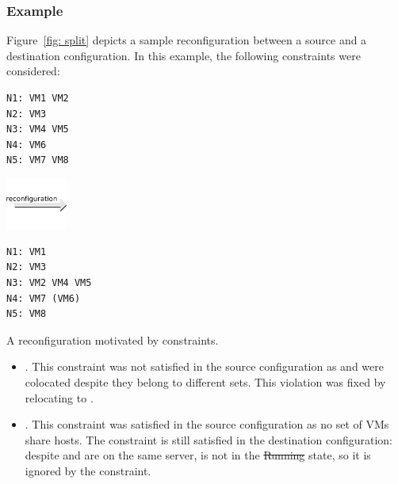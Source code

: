 \subsubsection{Example}

Figure~\ref{fig: split} depicts a sample reconfiguration between a source and a destination configuration. In this example, the following  constraints were considered:

\begin{reconfiguration}
\centering
\begin{minipage}[b]{0.40\textwidth}
\begin{lstlisting}
N1: VM1 VM2
N2: VM3
N3: VM4 VM5
N4: VM6
N5: VM7 VM8
\end{lstlisting}
\end{minipage}
\begin{minipage}[b]{2cm}
\includegraphics[width=2cm]{img/arrow_reconfiguration}
\end{minipage}
\begin{minipage}[b]{0.40\textwidth}
\begin{lstlisting}
N1: VM1
N2: VM3
N3: VM2 VM4 VM5
N4: VM7 (VM6)
N5: VM8
\end{lstlisting}
\end{minipage}
\caption{A reconfiguration motivated by  constraints.}\label{fig: split}
\end{reconfiguration}


\begin{itemize}

\item {}. This constraint was not satisfied in the source configuration as
 and  were colocated despite they belong to different sets. This violation was fixed
by relocating  to .

\item {}. This constraint was satisfied in the sour\-ce configuration as no set of VMs share hosts. The constraint is still satisfied in the destination configuration: despite  and  are on the same server,  is not in the \st{Running} state, so it is ignored by the constraint.

\end{itemize}

